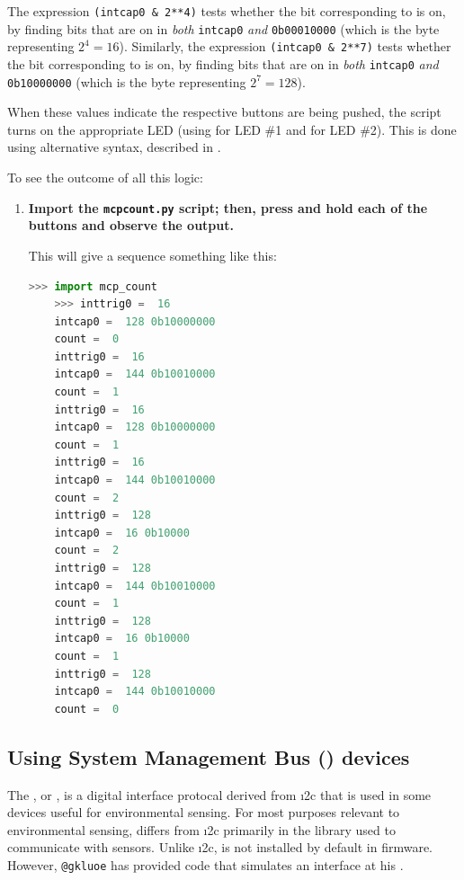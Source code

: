 The expression \lstinline{(intcap0 & 2**4)} tests whether the bit corresponding to  is on, by finding bits that are on in \emph{both} \lstinline{intcap0} \emph{and} \lstinline{0b00010000} (which is the byte representing $2^4 = 16$).
Similarly, the expression \lstinline{(intcap0 & 2**7)} tests whether the bit corresponding to  is on, by finding bits that are on in \emph{both} \lstinline{intcap0} \emph{and} \lstinline{0b10000000} (which is the byte representing $2^7 = 128$).

When these values indicate the respective buttons are being pushed, the script turns on the appropriate LED (using  for LED \#1 and  for LED \#2).
This is done using alternative syntax, described in .

To see the outcome of all this logic:
\begin{enumerate}[resume]
	\item \textbf{Import the \texttt{mcp\textunderscore count.py} script; then, press and hold each of the buttons and observe the output.}

	This will give a sequence something like this:
  \begin{lstlisting}[language=Python]
	>>> import mcp_count
	>>> inttrig0 =  16
	intcap0 =  128 0b10000000
	count =  0
	inttrig0 =  16
	intcap0 =  144 0b10010000
	count =  1
	inttrig0 =  16
	intcap0 =  128 0b10000000
	count =  1
	inttrig0 =  16
	intcap0 =  144 0b10010000
	count =  2
	inttrig0 =  128
	intcap0 =  16 0b10000
	count =  2
	inttrig0 =  128
	intcap0 =  144 0b10010000
	count =  1
	inttrig0 =  128
	intcap0 =  16 0b10000
	count =  1
	inttrig0 =  128
	intcap0 =  144 0b10010000
	count =  0
\end{lstlisting}
\end{enumerate}




\subsection{Using System Management Bus (\smbus) devices}
The , or \smbus, is a digital interface protocal derived from \i2c that is used in some devices useful for environmental sensing.
For most purposes relevant to environmental sensing, \smbus differs from \i2c primarily in the \Micropython library used to communicate with sensors.
Unlike \i2c, \smbus is not installed by default in \Micropython firmware.
However, \verb|@gkluoe| has provided code that simulates an \smbus interface at his .

